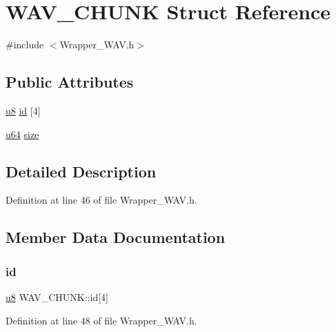 \hypertarget{struct_w_a_v___c_h_u_n_k}{}\section{W\+A\+V\+\_\+\+C\+H\+U\+NK Struct Reference}
\label{struct_w_a_v___c_h_u_n_k}


{\ttfamily \#include $<$Wrapper\+\_\+\+W\+A\+V.\+h$>$}

\subsection*{Public Attributes}
\begin{DoxyCompactItemize}
\item 
\mbox{\hyperlink{_util_8h_aed742c436da53c1080638ce6ef7d13de}{u8}} \mbox{\hyperlink{struct_w_a_v___c_h_u_n_k_ae56ae53081b52ccf0a672ba3e22f3910}{id}} \mbox{[}4\mbox{]}
\item 
\mbox{\hyperlink{_util_8h_ad758b7a5c3f18ed79d2fcd23d9f16357}{u64}} \mbox{\hyperlink{struct_w_a_v___c_h_u_n_k_a202ff2b47df8f3e2bbae459b4e3180fd}{size}}
\end{DoxyCompactItemize}


\subsection{Detailed Description}


Definition at line 46 of file Wrapper\+\_\+\+W\+A\+V.\+h.



\subsection{Member Data Documentation}
\mbox{\label{struct_w_a_v___c_h_u_n_k_ae56ae53081b52ccf0a672ba3e22f3910}} 
\subsubsection{\texorpdfstring{id}{id}}
{\footnotesize\ttfamily \mbox{\hyperlink{_util_8h_aed742c436da53c1080638ce6ef7d13de}{u8}} W\+A\+V\+\_\+\+C\+H\+U\+N\+K\+::id\mbox{[}4\mbox{]}}



Definition at line 48 of file Wrapper\+\_\+\+W\+A\+V.\+h.

